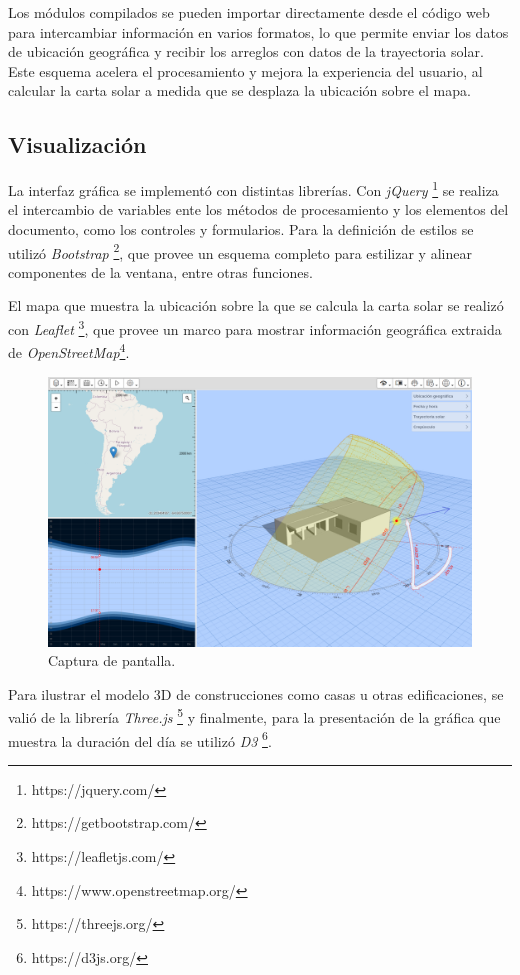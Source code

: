 \documentclass[a4paper]{article}
\begin{document}
Los módulos compilados se pueden importar directamente desde el código web para intercambiar información en varios formatos, lo que permite enviar los datos de ubicación geográfica y recibir los arreglos con datos de la trayectoria solar. Este esquema acelera el procesamiento y mejora la experiencia del usuario, al calcular la carta solar a medida que se desplaza la ubicación sobre el mapa.

\subsection{Visualización}

La interfaz gráfica se implementó con distintas librerías. Con \textit{jQuery} \footnote{https://jquery.com/} se realiza el intercambio de variables ente los métodos de procesamiento y los elementos del documento, como los controles y formularios. Para la definición de estilos se utilizó \textit{Bootstrap} \footnote{https://getbootstrap.com/}, que provee un esquema completo para estilizar y alinear componentes de la ventana, entre otras funciones.

El mapa que muestra la ubicación sobre la que se calcula la carta solar se realizó con \textit{Leaflet} \footnote{https://leafletjs.com/}, que provee un marco para mostrar información geográfica extraida de \textit{OpenStreetMap}\footnote{https://www.openstreetmap.org/}.

\begin{figure}[ht]
    \centering
    \includegraphics[width=\textwidth]{images/screenshot.png}
    \caption{Captura de pantalla.}
    \label{fig:screenshot}
\end{figure}

Para ilustrar el modelo 3D de construcciones como casas u otras edificaciones, se valió de la librería \textit{Three.js} \footnote{https://threejs.org/} y finalmente, para la presentación de la gráfica que muestra la duración del día se utilizó \textit{D3} \footnote{https://d3js.org/}.
\end{document}
